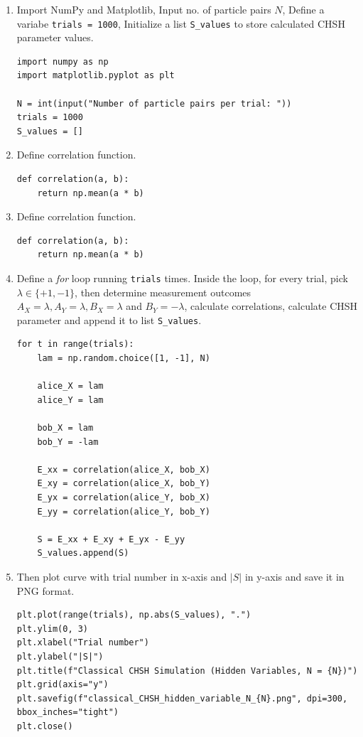 \documentclass[17pt,a4paper]{extarticle}
\begin{document}
\begin{enumerate}

\item Import NumPy and Matplotlib, Input no. of particle pairs $N$, Define a variabe \texttt{trials = 1000}, Initialize a list \texttt{S\_values} to store calculated CHSH parameter values.
\begin{lstlisting}
import numpy as np
import matplotlib.pyplot as plt

N = int(input("Number of particle pairs per trial: "))
trials = 1000
S_values = []
\end{lstlisting}

\item Define correlation function.
\begin{lstlisting}
def correlation(a, b):
    return np.mean(a * b)
\end{lstlisting}

\item Define correlation function.
\begin{lstlisting}
def correlation(a, b):
    return np.mean(a * b)
\end{lstlisting}

\item Define a \textit{for} loop running \texttt{trials} times. Inside the loop, for every trial, pick $\lambda \in \{+1, -1\}$, then determine measurement outcomes $A_X=\lambda, A_Y=\lambda, B_X=\lambda$ and $B_Y=-\lambda$, calculate correlations, calculate CHSH parameter and append it to list \texttt{S\_values}.
\begin{lstlisting}
for t in range(trials):
    lam = np.random.choice([1, -1], N)

    alice_X = lam
    alice_Y = lam

    bob_X = lam
    bob_Y = -lam

    E_xx = correlation(alice_X, bob_X)
    E_xy = correlation(alice_X, bob_Y)
    E_yx = correlation(alice_Y, bob_X)
    E_yy = correlation(alice_Y, bob_Y)

    S = E_xx + E_xy + E_yx - E_yy
    S_values.append(S)
\end{lstlisting}

\item Then plot curve with trial number in x-axis and $|S|$ in y-axis and save it in PNG format.
\begin{lstlisting}
plt.plot(range(trials), np.abs(S_values), ".")
plt.ylim(0, 3)
plt.xlabel("Trial number")
plt.ylabel("|S|")
plt.title(f"Classical CHSH Simulation (Hidden Variables, N = {N})")
plt.grid(axis="y")
plt.savefig(f"classical_CHSH_hidden_variable_N_{N}.png", dpi=300, bbox_inches="tight")
plt.close()
\end{lstlisting}
\end{enumerate}
\end{document}
